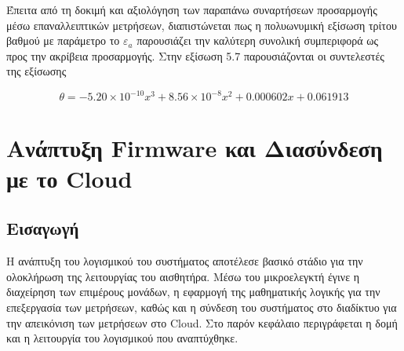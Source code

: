 \begin{table}[H]
    \centering

    \renewcommand{\arraystretch}{0.8}
    \setlength{\tabcolsep}{45pt}


    \caption{Σύγκριση των μοντέλων προσαρμογής βάσει των
    δεικτών $R^2$ και RMSE (m³/m³).}
    \label{tab:model_comparison}
\end{table}


\par Έπειτα από τη δοκιμή και αξιολόγηση των παραπάνω συναρτήσεων προσαρμογής μέσω επαναλλειπτικών μετρήσεων, διαπιστώνεται πως η πολυωνυμική εξίσωση τρίτου βαθμού με παράμετρο το \(\varepsilon_{a}\) παρουσιάζει την καλύτερη συνολική συμπεριφορά ως προς την ακρίβεια προσαρμογής. Στην εξίσωση 5.7 παρουσιάζονται οι συντελεστές της εξίσωσης

\[
\theta = -5.20 \times 10^{-10}x^3 + 8.56 \times 10^{-8}x^2 + 0.000602x + 0.061913
\tag{5.7}\]









\chapter{Ανάπτυξη Firmware και Διασύνδεση με το Cloud}
\label{ch:firmware}

\section{Εισαγωγή}
Η ανάπτυξη του λογισμικού του συστήματος αποτέλεσε βασικό στάδιο για την ολοκλήρωση της λειτουργίας του αισθητήρα. Μέσω του μικροελεγκτή έγινε η διαχείρηση των επιμέρους μονάδων, η εφαρμογή της μαθηματικής λογικής για την επεξεργασία των μετρήσεων, καθώς και η σύνδεση του συστήματος στο διαδίκτυο για την απεικόνιση των μετρήσεων στο Cloud. Στο παρόν κεφάλαιο περιγράφεται η δομή και η λειτουργία του λογισμικού που αναπτύχθηκε.



